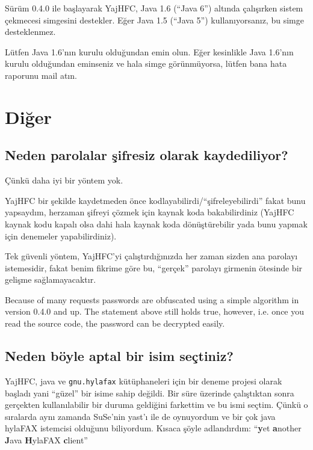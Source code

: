 \documentclass[a4paper,10pt]{scrartcl}
\begin{document}
Sürüm 0.4.0 ile başlayarak YajHFC, Java 1.6 (``Java 6'') altında çalışırken sistem çekmecesi simgesini destekler. Eğer Java 1.5 (``Java 5'') kullanıyorsanız, bu simge desteklenmez.

Lütfen Java 1.6'nın kurulu olduğundan emin olun. Eğer kesinlikle Java 1.6'nın kurulu olduğundan eminseniz ve hala simge görünmüyorsa, lütfen bana hata raporunu mail atın.

\section{Diğer}

\subsection{Neden parolalar şifresiz olarak kaydediliyor?}

Çünkü daha iyi bir yöntem yok.

YajHFC bir şekilde kaydetmeden önce kodlayabilirdi/``şifreleyebilirdi'' fakat
bunu yapsaydım, herzaman şifreyi çözmek için kaynak koda bakabilirdiniz 
(YajHFC kaynak kodu kapalı olsa dahi hala kaynak koda dönüştürebilir 
yada bunu yapmak için denemeler yapabilirdiniz).

Tek güvenli yöntem, YajHFC'yi çalıştırdığınızda her zaman sizden ana parolayı 
istemesidir, fakat benim fikrime göre bu, ``gerçek'' parolayı girmenin ötesinde
bir gelişme sağlamayacaktır.

Because of many requests passwords are obfuscated using a simple algorithm in version 0.4.0 and up.
The statement above still holds true, however, i.e. once you read the source code, the password can be decrypted easily.

\subsection{Neden böyle aptal bir isim seçtiniz?}

YajHFC, java ve \texttt{gnu.hylafax} kütüphaneleri için bir deneme projesi olarak başladı
yani ``güzel'' bir isime sahip değildi. Bir süre üzerinde çalıştıktan sonra 
gerçekten kullanılabilir bir duruma geldiğini farkettim ve bu ismi seçtim. 
Çünkü o sıralarda aynı zamanda SuSe'nin yast'ı ile de oynuyordum ve bir çok java hylaFAX istemcisi 
olduğunu biliyordum. Kısaca şöyle adlandırdım:
``\textbf{y}et \textbf{a}nother \textbf{J}ava \textbf{H}ylaFAX \textbf{c}lient''
\end{document}
